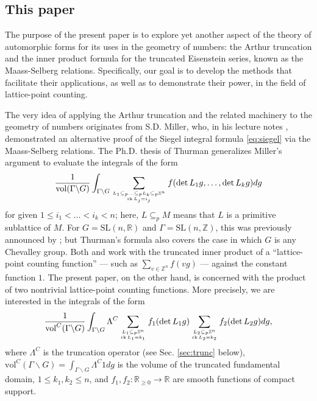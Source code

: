 \documentclass[11pt]{amsart}
\def\R{\mathbb{R}}
\numberwithin{theorem}{section}
\numberwithin{equation}{section}
\theoremstyle{remark}
\theoremstyle{definition}
\newcommand{\Z}{\mathbb{Z}}
\newcommand{\SL}{\mathrm{SL}}
\newcommand{\rk}{\mathrm{rk\,}}
\newcommand{\vol}{\mathrm{vol}}
\newcommand{\G}{\Gamma}
\begin{document}
\subsection{This paper}

The purpose of the present paper is to explore yet another aspect of the theory of automorphic forms for its uses in the geometry of numbers: the Arthur truncation and the inner product formula for the truncated Eisenstein series, known as the Maass-Selberg relations. Specifically, our goal is to develop the methods that facilitate their applications, as well as to demonstrate their power, in the field of lattice-point counting.

The very idea of applying the Arthur truncation and the related machinery to the geometry of numbers originates from S.D. Miller, who, in his lecture notes \cite{Mil20}, demonstrated an alternative proof of the Siegel integral formula \eqref{eq:siegel} via the Maass-Selberg relations. The Ph.D. thesis of Thurman \cite{Thu24} generalizes Miller's argument to evaluate the integrals of the form
\begin{align*}
\frac{1}{\vol(\Gamma\backslash G)}\int_{\Gamma\backslash G} \sum_{L_1 \subseteq_{p}\ldots\subseteq_{p}L_k \subseteq_p \Z^n \atop \rk L_j=i_j} f(\det L_1g,\ldots,\det L_k g) dg
\end{align*}
for given $1 \leq i_1 < \ldots < i_k <n$; here, $L\subseteq_p M$ means that $L$ is a primitive sublattice of $M$. For $G=\SL(n,\R)$ and $\Gamma=\SL(n,\Z)$, this was previously announced by \cite[Theorem 5]{Kim22}; but Thurman's formula also covers the case in which $G$ is any Chevalley group. Both \cite{Mil20} and \cite{Thu24} work with the truncated inner product of a ``lattice-point counting function'' --- such as $\sum_{v \in \Z^n} f(vg)$ --- against the constant function $1$. The present paper, on the other hand, is concerned with the product of two nontrivial lattice-point counting functions. More precisely, we are interested in the integrals of the form
\begin{align}\label{eq:intro_goal}
\frac{1}{\vol^C(\Gamma\backslash G)} \int_{\Gamma\backslash G} \Lambda^C\sum_{L_1 \subseteq _p\Z^n \atop \rk L_1=k_1} f_1(\det L_1g) \sum_{L_2 \subseteq_p\Z^n \atop \rk L_2=k_2} f_2(\det L_2g)dg,
\end{align}
where $\Lambda^C$ is the truncation operator (see Sec. \ref{sec:trunc} below), $\vol^C(\Gamma\backslash G)=\int_{\G\backslash G}\Lambda^C1dg$ is the volume of the truncated fundamental domain, $1 \leq k_1,k_2 \leq n$, and $f_1,f_2:\R_{\geq 0} \rightarrow \R$ are smooth functions of compact support.
\end{document}
